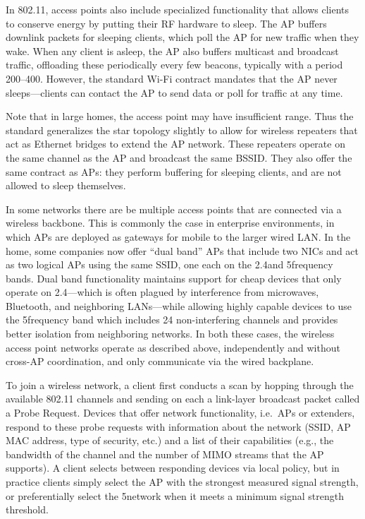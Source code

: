 In 802.11, access points also include specialized functionality that allows clients to conserve energy by putting their RF hardware to sleep. The AP buffers downlink packets for sleeping clients, which poll the AP for new traffic when they wake. When any client is asleep, the AP also buffers multicast and broadcast traffic, offloading these periodically every few beacons, typically with a period 200\ms--400\ms. However, the standard Wi-Fi contract mandates that the AP never sleeps---clients can contact the AP to send data or poll for traffic at any time.

Note that in large homes, the access point may have insufficient range. Thus the standard generalizes the star topology slightly to allow for wireless repeaters that act as Ethernet bridges to extend the AP network. These repeaters operate on the same channel as the AP and broadcast the same BSSID\@. They also offer the same contract as APs: they perform buffering for sleeping clients, and are not allowed to sleep themselves.

\label{sec:wds}
In some networks there are be multiple access points that are connected via a wireless backbone. This is commonly the case in enterprise environments, in which APs are deployed as gateways for mobile to the larger wired LAN\@. In the home, some companies now offer ``dual band'' APs that include two NICs and act as two logical APs using the same SSID, one each on the 2.4\GHz and 5\GHz frequency bands. Dual band functionality maintains support for cheap devices that only operate on 2.4\GHz---which is often plagued by interference from microwaves, Bluetooth, and neighboring LANs---while allowing highly capable devices to use the 5\GHz frequency band which includes 24 non-interfering channels and provides better isolation from neighboring networks. In both these cases, the wireless access point networks operate as described above, independently and without cross-AP coordination, and only communicate via the wired backplane.

To join a wireless network, a client first conducts a scan by hopping through the available 802.11 channels and sending on each a link-layer broadcast packet called a Probe Request. Devices that offer network functionality, i.e.\ APs or extenders, respond to these probe requests with information about the network (SSID, AP MAC address, type of security, etc.) and a list of their capabilities (e.g., the bandwidth of the channel and the number of MIMO streams that the AP supports). A client selects between responding devices via local policy, but in practice clients simply select the AP with the strongest measured signal strength, or preferentially select the 5\GHz network when it meets a minimum signal strength threshold.

